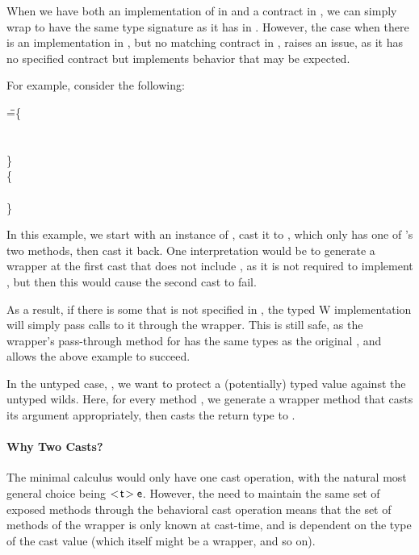 \documentclass[a4paper,USenglish]{tex/lipics-v2016}
\begin{document}
When we have both an implementation of \m in \md[1] and a contract \m in
\mdp[1], we can simply wrap \m to have the same type signature as it has in
\mdp[1]. However, the case when there is an implementation \m in \md[1], but
no matching contract in \mdp[1], raises an issue, as it has no specified
contract but implements behavior that may be expected.

For example, consider the following:

\begin{tabbing}
\hspace{1cm}\K\HS
{} \HS\HS\HS\WHERE\HS
  \K\HS =\HS \= \class\= \C \{\\
       \> \HS {}\x\any\any{\HS\x\HS}\\
       \> \HS {}\x\any\any{\HS\x\HS}\\
       \> \}  \\
       \>\class \D \{\\
       \> \HS {}\\
       \> \}
\end{tabbing}

In this example, we start with an instance of , cast it to , which
only has one of 's two methods, then cast it back. One interpretation
would be to generate a wrapper at the first cast that does not include ,
as it is not required to implement , but then this would cause the
second cast to fail.

As a result, if there is some \m that is not specified in \mdp[1], the typed W
implementation will simply pass calls to it through the wrapper. This is still
safe, as the wrapper's pass-through method for \m has the same types as the
original \m, and allows the above example to succeed.

In the untyped case, , we want to protect a (potentially) typed
value against the untyped wilds. Here, for every method \m, we generate a 
wrapper method that casts its argument appropriately, then casts the return
type to \any. 

\paragraph*{Why Two Casts?}

The minimal calculus would only have one cast operation, with the natural most
general choice being $\SubCast\t\e$. However, the need to maintain the same
set of exposed methods through the behavioral cast operation means that the
set of methods of the wrapper is only known at cast-time, and is dependent on
the type of the cast value (which itself might be a wrapper, and so on). 
\end{document}
